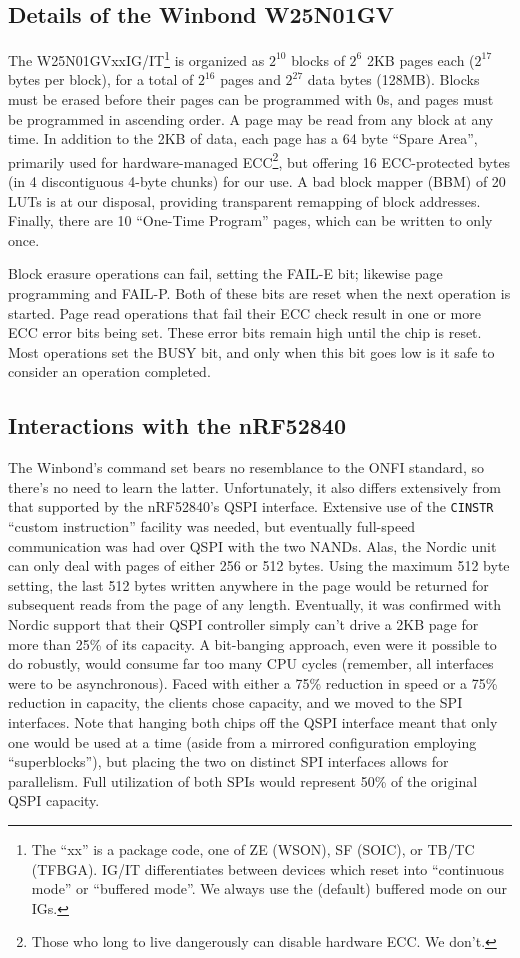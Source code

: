\documentclass[letterpaper,10pt]{article}
\begin{document}
\subsection{Details of the Winbond W25N01GV}
The W25N01GVxxIG/IT\footnote{The ``xx'' is a package code, one of ZE (WSON), SF (SOIC),
or TB/TC (TFBGA). IG/IT differentiates between devices which reset into ``continuous mode''
or ``buffered mode''. We always use the (default) buffered mode on our IGs.} is
organized as $2^{10}$ blocks of $2^6$ 2KB pages each ($2^{17}$ bytes per block), for
a total of $2^{16}$ pages and $2^{27}$ data bytes (128MB). Blocks must be
erased before their pages can be programmed with 0s, and pages must be
programmed in ascending order. A page may be read from any block at any time.
In addition to the 2KB of data, each page has a 64 byte ``Spare Area'',
primarily used for hardware-managed ECC\footnote{Those who long to live
dangerously can disable hardware ECC. We don't.}, but offering 16 ECC-protected bytes
(in 4 discontiguous 4-byte chunks) for our use. A bad block mapper (BBM) of 20
LUTs is at our disposal, providing transparent remapping of block addresses.
Finally, there are 10 ``One-Time Program'' pages, which can be written to only
once.

Block erasure operations can fail, setting the FAIL-E bit; likewise page
programming and FAIL-P. Both of these bits are reset when the next operation
is started. Page read operations that fail their ECC check result in one or
more ECC error bits being set. These error bits remain high until the chip is
reset. Most operations set the BUSY bit, and only when this bit goes low is it
safe to consider an operation completed.

\subsection{Interactions with the nRF52840}
The Winbond's command set bears no resemblance to the ONFI
standard\parencite{onfi}, so there's no need to learn the latter. Unfortunately,
it also differs extensively from that supported by the nRF52840's QSPI
interface. Extensive use of the {\texttt{CINSTR}} ``custom instruction''
facility was needed, but eventually full-speed communication was had over
QSPI with the two NANDs. Alas, the Nordic unit can only deal with pages of
either 256 or 512 bytes. Using the maximum 512 byte setting, the last 512 bytes
written anywhere in the page would be returned for subsequent reads from the
page of any length. Eventually, it was confirmed with Nordic support that their
QSPI controller simply can't drive a 2KB page for more than 25\% of its
capacity. A bit-banging approach, even were it possible to do robustly,
would consume far too many CPU cycles (remember, all interfaces were to be
asynchronous). Faced with either a 75\% reduction in speed or a 75\% reduction
in capacity, the clients chose capacity, and we moved to the SPI interfaces.
Note that hanging both chips off the QSPI interface meant that only one would
be used at a time (aside from a mirrored configuration employing
``superblocks''\parencite{superblocks}), but placing the two on distinct SPI
interfaces allows for parallelism. Full utilization of both SPIs would represent
50\% of the original QSPI capacity.
\end{document}
